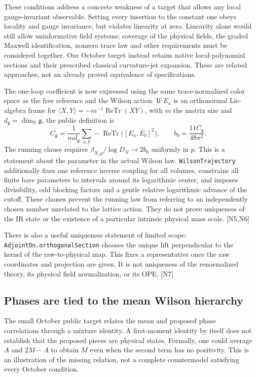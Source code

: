 \documentclass[11pt]{article}
\newcommand{\R}{\mathbb R}
\newcommand{\g}{\mathfrak g}
\newcommand{\code}[1]{{\small\nolinkurl{#1}}}
\newcommand{\src}[1]{\textsf{[#1]}}
\begin{document}
These conditions address a concrete weakness of a target that allows any
local gauge-invariant observable. Setting every insertion to the constant
one obeys locality and gauge invariance, but violates linearity at zero.
Linearity alone would still allow uninformative field systems; coverage of
the physical fields, the graded Maxwell identification, nonzero trace law
and other requirements must be considered together. Our October target
instead retains native local-polynomial sections and their prescribed
classical curvature-jet expansion. These are related approaches, not an
already proved equivalence of specifications.

The one-loop coefficient is now expressed using the same trace-normalized
color space as the free reference and the Wilson action. If $E_a$ is an
orthonormal Lie-algebra frame for
$\langle X,Y\rangle=-m^{-1}\operatorname{ReTr}(XY)$, with $m$ the matrix
size and $d_{\g}=\dim_\R\g$, the public definition is
\begin{equation}\label{eq:casimir}
 C_{\g}=\frac{1}{m d_{\g}}\sum_{a,b}
       -\operatorname{ReTr}\bigl([E_a,E_b]^2\bigr),\qquad
 b_0=\frac{11C_{\g}}{48\pi^2}.
\end{equation}
The running clause requires $\beta_{N,p}/\log D_N\to 2b_0$ uniformly in
$p$. This is a statement about the parameter in the actual Wilson law.
\code{WilsonTrajectory} additionally fixes one reference inverse coupling
for all volumes, constrains all finite bare parameters to intervals around
its logarithmic center, and imposes divisibility, odd blocking factors and
a gentle relative logarithmic advance of the cutoff. These clauses prevent
the running law from referring to an independently chosen number unrelated
to the lattice action. They do not prove uniqueness of the IR state or the
existence of a particular intrinsic physical mass scale. \src{N5,N6}

There is also a useful uniqueness statement of limited scope:
\code{AdjointOn.orthogonalSection} chooses the unique lift perpendicular to
the kernel of the raw-to-physical map. This fixes a representative once the
raw coordinates and projection are given. It is not uniqueness of the
renormalized theory, its physical field normalization, or its OPE. \src{N7}

\subsection{Phases are tied to the mean Wilson hierarchy}

The small October public target relates the mean and proposed phase
correlations through a mixture identity. A first-moment identity by itself
does not establish that the proposed pieces are physical states. Formally,
one could average $A$ and $2M-A$ to obtain $M$ even when the second term has
no positivity. This is an illustration of the missing relation, not a
complete countermodel satisfying every October condition.
\end{document}
